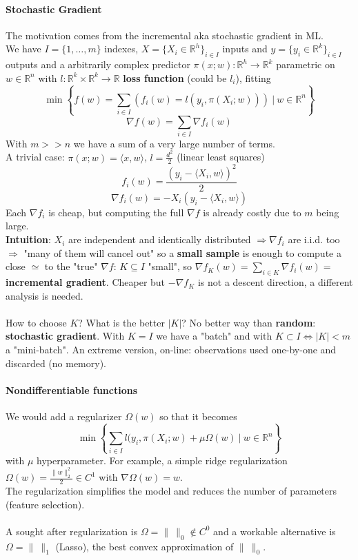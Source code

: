 \documentclass[10pt]{report}
\begin{document}
\paragraph{Stochastic Gradient} The motivation comes from the incremental aka stochastic gradient in ML.\\
We have $I=\{1,\ldots,m\}$ indexes, $X=\{X_i\in \mathbb{R}^h\}_{i\in I}$ inputs and $y=\{y_i\in \mathbb{R}^k\}_{i\in I}$ outputs and a arbitrarily complex predictor $\pi(x;w):\mathbb{R}^h\rightarrow \mathbb{R}^k$ parametric on $w\in \mathbb{R}^n$ with $l:\mathbb{R}^k\times \mathbb{R}^k \rightarrow \mathbb{R}$ \textbf{loss function} (could be $l_i$), fitting $$\min\left\{f(w) = \sum_{i\in I}\left(f_i(w) = l(y_i, \pi(X_i;w)) \right)\:|\:w\in \mathbb{R}^n\right\}$$
$$\nabla f(w) = \sum_{i\in I}\nabla f_i(w)$$
With $m >> n$ we have a sum of a very large number of terms.\\
A trivial case: $\pi(x;w) = \langle x,w\rangle$, $l=\frac{d^2}{2}$ (linear least squares)
$$f_i(w) = \frac{(y_i-\langle X_i, w\rangle)^2}{2}$$ $$\nabla f_i(w) = -X_i(y_i - \langle X_i, w\rangle)$$
Each $\nabla f_i$ is cheap, but computing the full $\nabla f$ is already costly due to $m$ being large.\\
\textbf{Intuition}: $X_i$ are independent and identically distributed $\Rightarrow\nabla f_i$ are i.i.d. too $\Rightarrow$ "many of them will cancel out" so a \textbf{small sample} is enough to compute a close $\simeq$ to the "true" $\nabla f$: $K\subseteq I$ "small", so $\nabla f_K(w) = \sum_{i\in K}\nabla f_i(w) =$ \textbf{incremental gradient}. Cheaper but $-\nabla f_K$ is not a descent direction, a different analysis is needed.\\\\
How to choose $K$? What is the better $|K|$? No better way than \textbf{random}: \textbf{stochastic gradient}. With $K = I$ we have a "batch" and with $K\subset I \Leftrightarrow |K| < m$ a "mini-batch". An extreme version, on-line: observations used one-by-one and discarded (no memory).
\paragraph{Nondifferentiable functions} We would add a regularizer $\Omega(w)$ so that it becomes $$\min\left\{\sum_{i\in I} l(y_i, \pi(X_i;w)+\mu\Omega(w)\:|\:w\in \mathbb{R}^n\right\}$$ with $\mu$ hyperparameter. For example, a simple ridge regularization $\Omega(w) = \frac{\displaystyle \|w\|_2^2}{\displaystyle 2}\in C^1$ with $\nabla\Omega(w) = w$.\\
The regularization simplifies the model and reduces the number of parameters (feature selection).\\\\
A sought after regularization is $\Omega = \|\:\|_0\not\in C^0$ and a workable alternative is $\Omega = \|\:\|_1$ (Lasso), the best convex approximation of $\|\:\|_0$.
\pagebreak
\end{document}
